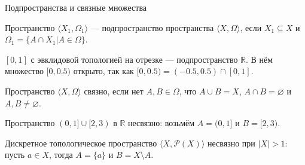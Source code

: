 \documentclass[aspectratio=169]{beamer}
\begin{document}
\begin{frame}{Подпространства и связные множества}
\begin{defrus}Пространство $\langle X_1, \Omega_1\rangle$ --- подпространство пространства $\langle X, \Omega\rangle$,
если $X_1 \subseteq X$ и $\Omega_1 = \{ A\cap X_1 | A \in \Omega\}$.
\end{defrus}
\begin{exmprus} $[0,1]$ с эвклидовой топологией на отрезке --- подпространство $\mathbb{R}$.
В нём множество $[0,0.5)$ открыто, так как $[0,0.5) = (-0.5,0.5) \cap [0,1]$.\end{exmprus}

\begin{defrus}Пространство $\langle X, \Omega\rangle$ связно, если нет $A,B \in \Omega$, что $A\cup B = X$,
$A \cap B = \varnothing$ и $A,B \ne \varnothing$.\end{defrus}

\begin{exmprus}Пространство $(0,1]\cup[2,3)$ в $\mathbb{R}$ несвязно: возьмём $A=(0,1]$ и $B = [2,3)$.

Дискретное топологическое пространство $\langle X, \mathcal{P}(X)\rangle$ несвязно при $|X| > 1$: пусть $a \in X$, 
тогда $A = \{a\}$ и $B = X \setminus A$.
\end{exmprus}
\end{frame}
\end{document}
